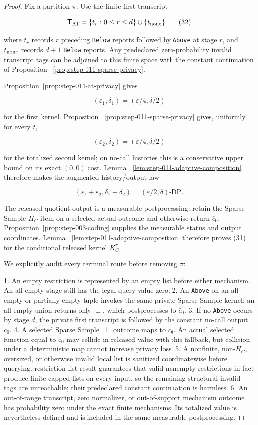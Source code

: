 \begin{proof}
Fix a partition \(\pi\). Use the finite first transcript

\[
 \mathsf T_{\rm AT}
 =\{t_r:0\leq r\leq d\}\cup\{t_{\rm none}\}
\tag{32}
\]

where \(t_r\) records \(r\) preceding \texttt{Below} reports followed by \texttt{Above}
at stage \(r\), and \(t_{\rm none}\) records \(d+1\) \texttt{Below} reports. Any
predeclared zero-probability invalid transcript tags can be adjoined to this
finite space with the constant continuation of Proposition
~\ref{prop:step-011-sparse-privacy}.

Proposition~\ref{prop:step-011-at-privacy} gives

\[
 (\varepsilon_1,\delta_1)
 =(\varepsilon/4,\delta/2)
\]

for the first kernel. Proposition
~\ref{prop:step-011-sparse-privacy} gives, uniformly for every \(t\),

\[
 (\varepsilon_2,\delta_2)
 =(\varepsilon/4,\delta/2)
\]

for the totalized second kernel; on no-call histories this is a conservative
upper bound on its exact \((0,0)\) cost. Lemma
~\ref{lem:step-011-adaptive-composition} therefore makes the augmented
history/output law

\[
 (\varepsilon_1+\varepsilon_2,
   \delta_1+\delta_2)
 =(\varepsilon/2,\delta)\text{-DP}.
\tag{33}
\]

The released quotient output is a measurable postprocessing: retain the
Sparse Sample \(H_C\)-item on a selected actual outcome and otherwise return
\(\bar c_0\). Proposition~\ref{prop:step-003-coding} supplies the
measurable status and output coordinates. Lemma
~\ref{lem:step-011-adaptive-composition} therefore proves (31) for the
conditional released kernel \(K_C^{\pi}\).

We explicitly audit every terminal route before removing \(\pi\):

1. An empty restriction is represented by an empty list before either
   mechanism. An all-empty stage still has the legal query value zero.
2. An \texttt{Above} on an all-empty or partially empty tuple invokes the same
   private Sparse Sample kernel; an all-empty union returns only \(\perp\),
   which postprocesses to \(\bar c_0\).
3. If no \texttt{Above} occurs by stage \(d\), the private first transcript is
   followed by the constant no-call output \(\bar c_0\).
4. A selected Sparse Sample \(\perp\) outcome maps to \(\bar c_0\). An
   actual selected function equal to \(\bar c_0\) may collide in released
   value with this fallback, but collision under a deterministic map cannot
   increase privacy loss.
5. A nonfinite, non-\(H_C\), oversized, or otherwise invalid local list is
   sanitized coordinatewise before querying. restriction-list result guarantees
   that valid nonempty restrictions in fact produce finite capped lists on
   every input, so the remaining structural-invalid tags are unreachable;
   their predeclared constant continuation is harmless.
6. An out-of-range transcript, zero normalizer, or out-of-support mechanism
   outcome has probability zero under the exact finite mechanisms. Its
   totalized value is nevertheless defined and is included in the same
   measurable postprocessing.


\end{proof}
